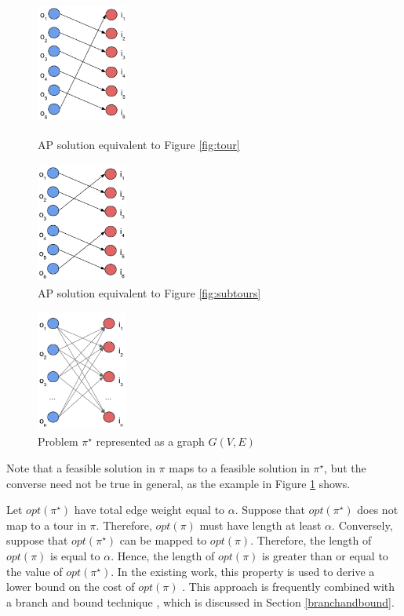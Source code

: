 \documentclass{mprop}
\theoremstyle{definition}
\begin{document}
\begin{figure}
\centering
\begin{minipage}{.5\textwidth}
\centering
 \includegraphics[width=3cm, height=4cm]{images/validAP.png}
 \caption{AP solution equivalent to Figure \ref{fig:tour}}
 \label{fig:validAP}
\end{minipage}%
\begin{minipage}{.5\textwidth}
\centering
 \includegraphics[width=3cm, height=4cm]{images/invalidAP.png}
 \caption{AP solution equivalent to Figure \ref{fig:subtours}}
 \label{fig:invalidAP}
\end{minipage}
\end{figure}

\begin{figure}
\centering
\includegraphics[width = 3cm, height = 4cm]{images/tspbipartite.png}
\caption{Problem $\pi^{\star}$ represented as a graph $G(V,E)$}
\label{fig:tspbipartite}
\end{figure}

Note that a feasible solution in $\pi$ maps to a feasible solution in $\pi^{\star}$, but the converse need not be true in general, as the example in Figure \ref{fig:invalidAP} shows.

Let $opt(\pi^{\star})$ have total edge weight equal to $\alpha$. Suppose that $opt(\pi^{\star})$ does not map to a tour in $\pi$. Therefore, $opt(\pi)$ must have length at least $\alpha$. Conversely, suppose that $opt(\pi^{\star})$ can be mapped to $opt(\pi)$. Therefore, the length of $opt(\pi)$ is equal to $\alpha$. Hence, the length of $opt(\pi)$ is greater than or equal to the value of $opt(\pi^{\star})$.
In the existing work, this property is used to derive a lower bound on the cost of $opt(\pi)$ \citep{Jonker80,Dantzig54,Dantzig59}. This approach is frequently combined with a branch and bound technique \citep{tspbible}, which is discussed in Section \ref{branchandbound}.
\end{document}
